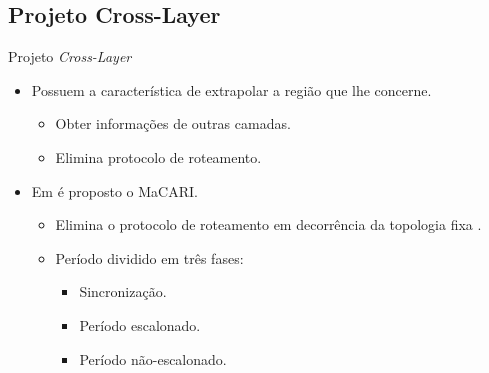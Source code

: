 \documentclass{beamer}
\begin{document}
\subsection{Projeto Cross-Layer}
\begin{frame}{Projeto \emph{Cross-Layer}}
  \hypertarget{macari_tree_back}{}
  \begin{itemize}
	\item Possuem a característica de extrapolar a região que lhe concerne.
	\begin{itemize}
	  \item Obter informações de outras camadas.
	  \item Elimina protocolo de roteamento.
	\end{itemize}
	\item Em \cite{20092812183087} é proposto o MaCARI.
	\begin{itemize}
	  \item Elimina o protocolo de roteamento em decorrência da topologia fixa \hyperlink{macari_tree}{}.
	  \item Período dividido em três fases:
	  \begin{itemize}
	    \item Sincronização.
	    \item Período escalonado.
	    \item Período não-escalonado.
	  \end{itemize}
	\end{itemize}
  \end{itemize}
\end{frame}
\end{document}
